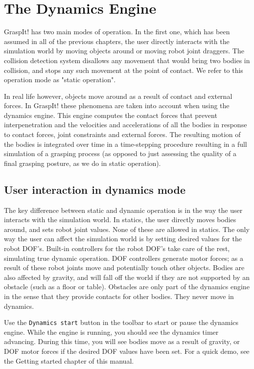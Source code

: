 \section{The Dynamics Engine}


GraspIt! has two main modes of operation. In the first one, which has
been assumed in all of the previous chapters, the user directly
interacts with the simulation world by moving objects around or moving
robot joint draggers. The collision detection system disallows any
movement that would bring two bodies in collision, and stops any such
movement at the point of contact. We refer to this operation mode as
"static operation".

In real life however, objects move around as a result of contact and
external forces. In GraspIt! these phenomena are taken into account
when using the dynamics engine. This engine computes the contact
forces that prevent interpenetration and the velocities and
accelerations of all the bodies in response to contact forces, joint
constraints and external forces. The resulting motion of the bodies is
integrated over time in a time-stepping procedure resulting in a full
simulation of a grasping process (as opposed to just assessing the
quality of a final grasping posture, as we do in static operation).

\subsection{User interaction in dynamics mode}

The key difference between static and dynamic operation is in the way
the user interacts with the simulation world. In statics, the user
directly moves bodies around, and sets robot joint values. None of
these are allowed in statics. The only way the user can affect the
simulation world is by setting desired values for the robot
DOF's. Built-in controllers for the robot DOF's take care of the rest,
simulating true dynamic operation. DOF controllers generate motor
forces; as a result of these robot joints move and potentially touch
other objects. Bodies are also affected by gravity, and will fall off
the world if they are not supported by an obstacle (such as a floor or
table). Obstacles are only part of the dynamics engine in the sense
that they provide contacts for other bodies. They never move in
dynamics.

Use the \texttt{Dynamics start} button in the toolbar to start or
pause the dynamics engine. While the engine is running, you should see
the dynamics timer advancing. During this time, you will see bodies
move as a result of gravity, or DOF motor forces if the desired DOF
values have been set. For a quick demo, see the Getting started
chapter of this manual.

